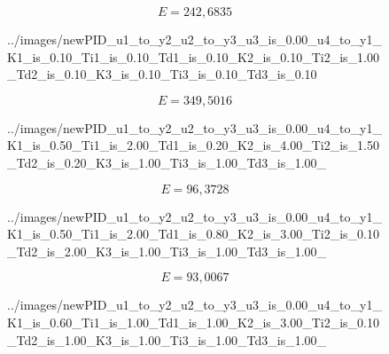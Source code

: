 \begin{equation}
    E = 242,6835
\end{equation}

\begin{figure}[H]
    \centering
    
    \caption{../images/newPID_u1_to_y2_u2_to_y3_u3_is_0.00_u4_to_y1_K1_is_0.10_Ti1_is_0.10_Td1_is_0.10_K2_is_0.10_Ti2_is_1.00_Td2_is_0.10_K3_is_0.10_Ti3_is_0.10_Td3_is_0.10}
\end{figure}

\begin{equation}
    E = 349,5016
\end{equation}

\begin{figure}[H]
    \centering
    
    \caption{../images/newPID_u1_to_y2_u2_to_y3_u3_is_0.00_u4_to_y1_K1_is_0.50_Ti1_is_2.00_Td1_is_0.20_K2_is_4.00_Ti2_is_1.50_Td2_is_0.20_K3_is_1.00_Ti3_is_1.00_Td3_is_1.00_}
\end{figure}

\begin{equation}
    E = 96,3728
\end{equation}

\begin{figure}[H]
    \centering
    
    \caption{../images/newPID_u1_to_y2_u2_to_y3_u3_is_0.00_u4_to_y1_K1_is_0.50_Ti1_is_2.00_Td1_is_0.80_K2_is_3.00_Ti2_is_0.10_Td2_is_2.00_K3_is_1.00_Ti3_is_1.00_Td3_is_1.00_}
\end{figure}

\begin{equation}
    E = 93,0067
\end{equation}

\begin{figure}[H]
    \centering
    
    \caption{../images/newPID_u1_to_y2_u2_to_y3_u3_is_0.00_u4_to_y1_K1_is_0.60_Ti1_is_1.00_Td1_is_1.00_K2_is_3.00_Ti2_is_0.10_Td2_is_1.00_K3_is_1.00_Ti3_is_1.00_Td3_is_1.00_}
\end{figure}

